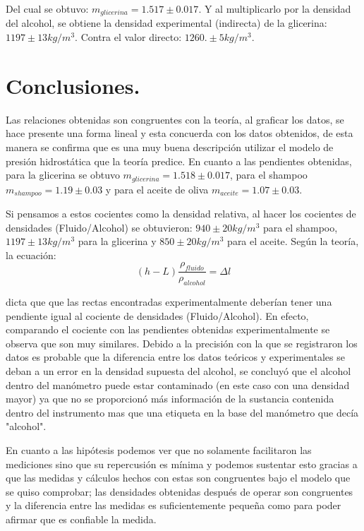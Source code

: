 \documentclass[a4paper]{article}
\begin{document}
Del cual se obtuvo: $m_{glicerina}=1.517\pm0.017$. Y al multiplicarlo por la densidad del alcohol, se obtiene la densidad experimental (indirecta) de la glicerina: $1197\pm13 kg/m^3$. Contra el valor directo: $1260.\pm5 kg/m^3$.

\newpage
\section*{Conclusiones.}

Las relaciones obtenidas son congruentes con la teoría, al graficar los datos, se hace presente una forma lineal y esta concuerda con los datos obtenidos, de esta manera se confirma que es una muy buena descripción utilizar el modelo de presión hidrostática que la teoría predice. En cuanto a las pendientes obtenidas, para la glicerina se obtuvo $m_{glicerina}=1.518\pm0.017$, para el shampoo $m_{shampoo}=1.19\pm0.03$ y para el aceite de oliva $m_{aceite}=1.07\pm0.03$. 

Si pensamos a estos cocientes como la densidad relativa, al hacer los cocientes de densidades (Fluido/Alcohol) se obtuvieron: $940\pm20 kg/m^3$ para el shampoo, $1197\pm13 kg/m^3$ para la glicerina y $850 \pm 20 kg/m^3$ para el aceite. Según la teoría, la ecuación:
\begin{equation}
    (h-L)\frac{\rho_{fluido}}{\rho_{alcohol}}=\Delta l
\end{equation}

dicta que que las rectas encontradas experimentalmente deberían tener una pendiente igual al cociente de densidades (Fluido/Alcohol). En efecto, comparando el cociente con las pendientes obtenidas experimentalmente se observa que son muy similares. Debido a la precisión con la que se registraron los datos es probable que la diferencia entre los datos teóricos y experimentales se deban a un error en la densidad supuesta del alcohol, se concluyó que el alcohol dentro del manómetro puede estar contaminado (en este caso con una densidad mayor) ya que no se proporcionó más información de la sustancia contenida dentro del instrumento mas que una etiqueta en la base del manómetro que decía "alcohol".

En cuanto a las hipótesis podemos ver que no solamente facilitaron las mediciones sino que su repercusión es mínima y podemos sustentar esto gracias a que las medidas y cálculos hechos con estas son congruentes bajo el modelo que se quiso comprobar; las densidades obtenidas después de operar son congruentes y la diferencia entre las medidas es suficientemente pequeña como para poder afirmar que es confiable la medida. 
\end{document}
